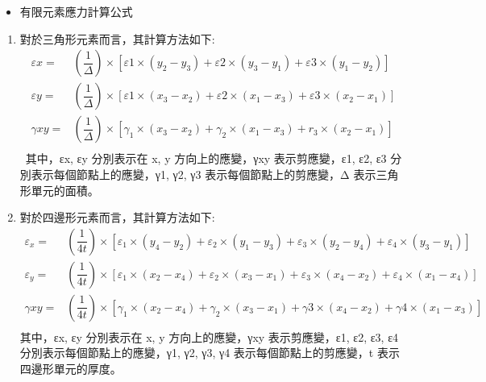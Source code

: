 \begin{itemize}
\item 有限元素應力計算公式
\end{itemize}
\begin{enumerate}
\item 對於三角形元素而言，其計算方法如下:\
\[
\begin{aligned}
\varepsilon x=&\left( \dfrac{1}{\Delta }\right) \times \left[ \varepsilon 1\times \left( y_{2}-y_{3}\right) +\varepsilon 2\times \left( y_{3}-y_{1}\right) +\varepsilon 3\times \left( y_{1}-y_{2}\right) \right]\\
\varepsilon y=&\left( \dfrac{1}{\Delta }\right) \times \left[ \varepsilon 1\times \left( x_{3}-x_{2}\right) +\varepsilon 2\times \left( x_{1}-x_{3}\right) +\varepsilon 3\times \left( x_{2}-x_{1}\right) \right]\\
\gamma xy=&\left( \dfrac{1}{\Delta }\right) \times \left[ \gamma _{1}\times \left( x_{3}-x_{2}\right) +\gamma _{2}\times \left( x_{1}-x_{3}\right) +r_{3}\times \left( x_{2}-x_{1}\right) \right]\\
\end{aligned}
\]\
其中，εx, εy 分別表示在 x, y 方向上的應變，γxy 表示剪應變，ε1, ε2, ε3 分別表示每個節點上的應變，γ1, γ2, γ3 表示每個節點上的剪應變，Δ 表示三角形單元的面積。\
\item 對於四邊形元素而言，其計算方法如下:\
\[
\begin{aligned}
\varepsilon _{x}=&\left( \dfrac{1}{4t}\right) \times \left[ \varepsilon _{1}\times \left( y_{4}-y_{2}\right) +\varepsilon _{2}\times \left( y_{1}-y_{3}\right) +\varepsilon _{3}\times \left( y_{2}-y_{4}\right) +\varepsilon _{4}\times \left( y_{3}-y_{1}\right) \right]\\
\varepsilon _{y}=&\left( \dfrac{1}{4t}\right) \times \left[ \varepsilon _{1}\times \left( x_{2}-x_{4}\right) +\varepsilon _{2}\times \left( x_{3}-x_{1}\right) +\varepsilon _{3}\times \left( x_{4}-x_{2}\right) +\varepsilon _{4}\times \left( x_{1}-x_{4}\right) \right]\\
\gamma xy=&\left( \dfrac{1}{4t}\right) \times \left[ \gamma _{1}\times \left( x_{2}-x_{4}\right) +\gamma _{2}\times \left( x_{3}-x_{1}\right) +\gamma 3\times \left( x_{4}-x_{2}\right) +\gamma 4\times \left( x_{1}-x_{3}\right) \right]\\
\end{aligned}
\]
其中，εx, εy 分別表示在 x, y 方向上的應變，γxy 表示剪應變，ε1, ε2, ε3, ε4 分別表示每個節點上的應變，γ1, γ2, γ3, γ4 表示每個節點上的剪應變，t 表示四邊形單元的厚度。
\end{enumerate}


